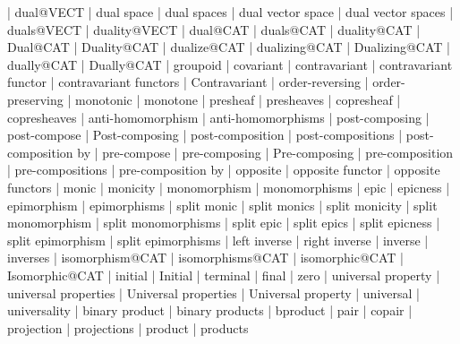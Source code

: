     |   dual@VECT
    |   dual space
    |   dual spaces
    |   dual vector space
    |   dual vector spaces
    |   duals@VECT
    |   duality@VECT
    |   dual@CAT
    |   duals@CAT
    |   duality@CAT
    |   Dual@CAT
    |   Duality@CAT
    |   dualize@CAT
    |   dualizing@CAT
    |   Dualizing@CAT
    |   dually@CAT
    |   Dually@CAT
    |   groupoid
    |   covariant
    |   contravariant
    |   contravariant functor
    |   contravariant functors
    |   Contravariant
    |   order-reversing
    |   order-preserving
    |   monotonic
    |   monotone
    |   presheaf
    |   presheaves
    |   copresheaf
    |   copresheaves
    |   anti-homomorphism
    |   anti-homomorphisms
    |   post-composing
    |   post-compose
    |   Post-composing
    |   post-composition
    |   post-compositions
    |   post-composition by
    |   pre-compose
    |   pre-composing
    |   Pre-composing
    |   pre-composition
    |   pre-compositions
    |   pre-composition by
    |   opposite
    |   opposite functor
    |   opposite functors
    |   monic
    |   monicity
    |   monomorphism
    |   monomorphisms
    |   epic
    |   epicness
    |   epimorphism
    |   epimorphisms
    |   split monic
    |   split monics
    |   split monicity
    |   split monomorphism
    |   split monomorphisms
    |   split epic
    |   split epics
    |   split epicness
    |   split epimorphism
    |   split epimorphisms
    |   left inverse
    |   right inverse
    |   inverse
    |   inverses
    |   isomorphism@CAT
    |   isomorphisms@CAT
    |   isomorphic@CAT
    |   Isomorphic@CAT
    |   initial
    |   Initial
    |   terminal
    |   final
    |   zero
    |   universal property
    |   universal properties
    |   Universal properties
    |   Universal property
    |   universal
    |   universality
    |   binary product
    |   binary products
    |   bproduct
    |   pair
    |   copair
    |   projection
    |   projections
    |   product
    |   products
